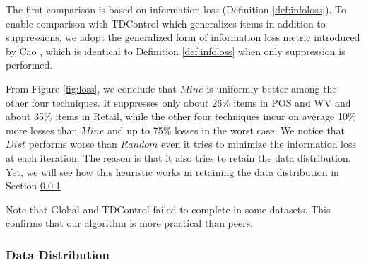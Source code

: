 The first comparison is based on information loss (Definition
 \ref{def:infoloss}).
To enable comparison with TDControl which generalizes items in addition to
suppressions, we adopt the generalized form of information loss metric introduced
 by Cao \etal \cite{Cao:2010:rho}, which is identical to Definition \ref{def:infoloss} when
 only suppression is performed.


From Figure \ref{fig:loss},
we conclude that $Mine$ is uniformly better among the other four techniques.
It suppresses only about 26\% items in POS and WV and about 35\% items in
Retail, while the other four techniques incur on average 10\% more losses
than  $Mine$ and up to 75\% losses in the worst case. We notice that $Dist$
performs worse than  $Random$ even it tries to minimize the information loss
at each iteration. The reason is that it also tries to retain the data
distribution. Yet, we will see how this heuristic works in retaining the data
distribution in Section \ref{sec:eval:datadistribution}


Note that Global and TDControl failed to complete in some datasets.
This confirms that our algorithm is more practical than peers.

\subsubsection{Data Distribution}\label{sec:eval:datadistribution}

